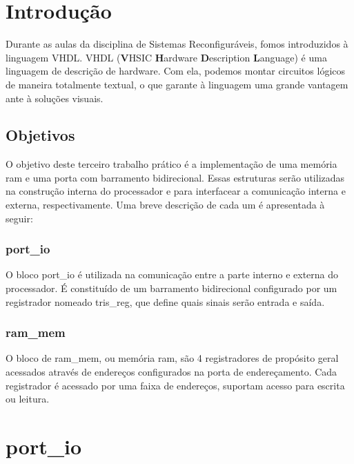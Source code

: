 \documentclass{article}
\begin{document}


\newpage
\thispagestyle{empty}
\tableofcontents

\newpage
\large %

\section{Introdução}

Durante as aulas da disciplina de Sistemas Reconfiguráveis, fomos introduzidos à linguagem VHDL. VHDL (\textbf{V}HSIC \textbf{H}ardware \textbf{D}escription \textbf{L}anguage) é uma linguagem de descrição de hardware. Com ela, podemos montar circuitos lógicos de maneira totalmente textual, o que garante à linguagem uma grande vantagem ante à soluções visuais.

\subsection{Objetivos}

O objetivo deste terceiro trabalho prático é a implementação de uma memória ram e uma porta com barramento bidirecional. Essas estruturas serão utilizadas na construção interna do processador e para interfacear a comunicação interna e externa, respectivamente. Uma breve descrição de cada um é apresentada à seguir:

\subsubsection{port\_io}

O bloco port\_io é utilizada na comunicação entre a parte interno e externa do processador. É constituído de um barramento bidirecional configurado por um registrador nomeado tris\_reg, que define quais sinais serão entrada e saída.

\subsubsection{ram\_mem}

O bloco de ram\_mem, ou memória ram, são 4 registradores de propósito geral acessados através de endereços configurados na porta de endereçamento. Cada registrador é acessado por uma faixa de endereços, suportam acesso para escrita ou leitura.

\newpage

\section{port\_io}
\end{document}
